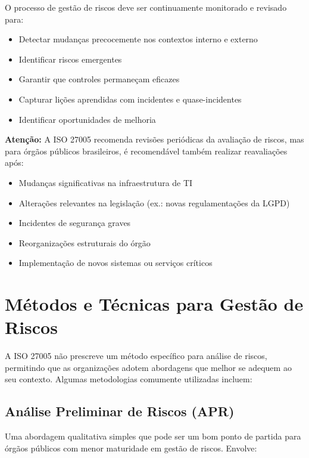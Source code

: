\documentclass[12pt,a4paper]{report}
\begin{document}
O processo de gestão de riscos deve ser continuamente monitorado e revisado para:

\begin{itemize}
  \item Detectar mudanças precocemente nos contextos interno e externo
  \item Identificar riscos emergentes
  \item Garantir que controles permaneçam eficazes
  \item Capturar lições aprendidas com incidentes e quase-incidentes
  \item Identificar oportunidades de melhoria
\end{itemize}

\begin{notebox}
\textbf{Atenção:} A ISO 27005 recomenda revisões periódicas da avaliação de riscos, mas para órgãos públicos brasileiros, é recomendável também realizar reavaliações após:

\begin{itemize}
  \item Mudanças significativas na infraestrutura de TI
  \item Alterações relevantes na legislação (ex.: novas regulamentações da LGPD)
  \item Incidentes de segurança graves
  \item Reorganizações estruturais do órgão
  \item Implementação de novos sistemas ou serviços críticos
\end{itemize}
\end{notebox}

\section{Métodos e Técnicas para Gestão de Riscos}

A ISO 27005 não prescreve um método específico para análise de riscos, permitindo que as organizações adotem abordagens que melhor se adequem ao seu contexto. Algumas metodologias comumente utilizadas incluem:

\subsection{Análise Preliminar de Riscos (APR)}

Uma abordagem qualitativa simples que pode ser um bom ponto de partida para órgãos públicos com menor maturidade em gestão de riscos. Envolve:
\end{document}
